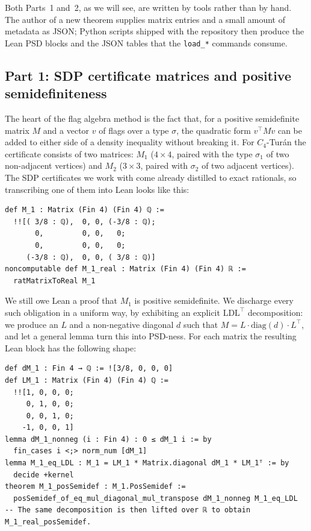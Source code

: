 \documentclass[11pt]{article}
\begin{document}
Both Parts~1 and~2, as we will see, are written by tools rather than by
hand. The author of a new theorem supplies matrix entries and a small
amount of metadata as JSON; Python scripts shipped with the repository then
produce the Lean PSD blocks and the JSON tables that the
\texttt{load\_*} commands consume.

\subsection{Part 1: SDP certificate matrices and positive semidefiniteness}

The heart of the flag algebra method is the fact that, for a positive
semidefinite matrix $M$ and a vector $v$ of flags over a type $\sigma$, the
quadratic form $v^\top M v$ can be added to either side of a density
inequality without breaking it. For $C_4$-Tur\'an the certificate consists
of two matrices: $M_1$ ($4 \times 4$, paired with the type $\sigma_1$ of
two non-adjacent vertices) and $M_2$ ($3 \times 3$, paired with $\sigma_2$
of two adjacent vertices). The SDP certificates we work with come already
distilled to exact rationals, so transcribing one of them into Lean looks
like this:

\begin{lstlisting}
def M_1 : Matrix (Fin 4) (Fin 4) ℚ :=
  !![( 3/8 : ℚ),  0, 0, (-3/8 : ℚ);
       0,         0, 0,   0;
       0,         0, 0,   0;
     (-3/8 : ℚ),  0, 0, ( 3/8 : ℚ)]
noncomputable def M_1_real : Matrix (Fin 4) (Fin 4) ℝ :=
  ratMatrixToReal M_1
\end{lstlisting}

We still owe Lean a proof that $M_1$ is positive semidefinite. We discharge
every such obligation in a uniform way, by exhibiting an explicit
$\mathrm{LDL}^\top$ decomposition: we produce an $L$ and a non-negative
diagonal $d$ such that $M = L \cdot \mathrm{diag}(d) \cdot L^\top$, and let
a general lemma turn this into PSD-ness. For each matrix the resulting Lean
block has the following shape:

\begin{lstlisting}
def dM_1 : Fin 4 → ℚ := ![3/8, 0, 0, 0]
def LM_1 : Matrix (Fin 4) (Fin 4) ℚ :=
  !![1, 0, 0, 0;
     0, 1, 0, 0;
     0, 0, 1, 0;
    -1, 0, 0, 1]
lemma dM_1_nonneg (i : Fin 4) : 0 ≤ dM_1 i := by
  fin_cases i <;> norm_num [dM_1]
lemma M_1_eq_LDL : M_1 = LM_1 * Matrix.diagonal dM_1 * LM_1ᵀ := by
  decide +kernel
theorem M_1_posSemidef : M_1.PosSemidef :=
  posSemidef_of_eq_mul_diagonal_mul_transpose dM_1_nonneg M_1_eq_LDL
-- The same decomposition is then lifted over ℝ to obtain M_1_real_posSemidef.
\end{lstlisting}
\end{document}
